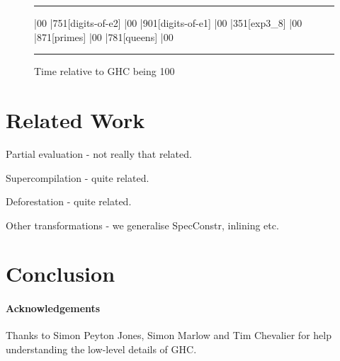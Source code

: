 \documentclass{llncs}
\newenvironment{fig}
    {\begin{figure}[tbp]\hrule}
    {\end{figure}}
\newcommand{\figend}{\hrule}
\begin{document}
\begin{fig}
\begin{barenv}
 
\bar{0}{0}
\bar{75}{1}[digits-of-e2]
\bar{0}{0}
\bar{90}{1}[digits-of-e1]
\bar{0}{0}
\bar{35}{1}[exp3\_8]
\bar{0}{0}
\bar{87}{1}[primes]
\bar{0}{0}
\bar{78}{1}[queens]
\bar{0}{0}
\end{barenv}
\figend
\caption{Time relative to GHC being 100}
\label{fig:haskell_results}
\end{fig}


\section{Related Work}

Partial evaluation - not really that related.

Supercompilation - quite related.

Deforestation - quite related.

Other transformations - we generalise SpecConstr, inlining etc.

\section{Conclusion}

\paragraph{Acknowledgements} Thanks to Simon Peyton Jones, Simon Marlow and Tim Chevalier for help understanding the low-level details of GHC.




\end{document}
